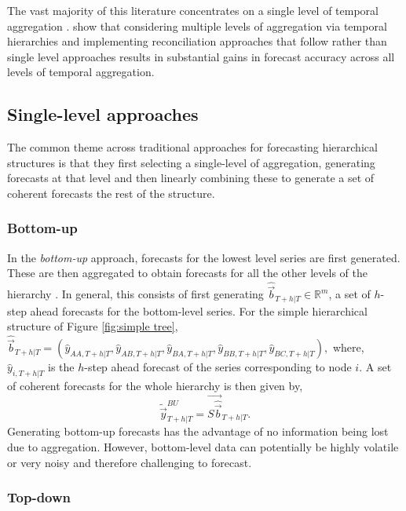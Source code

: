 \documentclass[graybox]{svmult}
\begin{document}
The vast majority of this literature concentrates on a single level of temporal aggregation \citep[there are some notable exceptions such as,][]{AndEtAl2011,KouEtAl2014}. \cite{AthEtAl2017} show that considering multiple levels of aggregation via temporal hierarchies and implementing reconciliation approaches that follow rather than single level approaches results in substantial gains in forecast accuracy across all levels of temporal aggregation.

\subsection{Single-level approaches}\label{sec:single level approaches}
The common theme across traditional approaches for forecasting hierarchical structures is that they first selecting a single-level of aggregation, generating forecasts at that level and then linearly combining these to generate a set of coherent forecasts the rest of the structure.

\subsubsection{Bottom-up}

In the \textit{bottom-up} approach, forecasts for the lowest level series are first generated. These are then aggregated to obtain forecasts for all the other levels of the hierarchy \citep{dunn1976}. In general, this consists of first generating $\hat{\vec{b}}_{T+h|T} \in \mathbb{R}^m$, a set of $h$-step ahead forecasts for the bottom-level series. For the simple hierarchical structure of Figure \ref{fig:simple tree}, $\hat{\vec{b}}_{T+h|T} = (\hat{{y}}_{AA,T+h|T}, \hat{{y}}_{AB,T+h|T}, \hat{{y}}_{BA,T+h|T}, \hat{{y}}_{BB,T+h|T},\hat{{y}}_{BC,T+h|T}),$ where, $\hat{{y}}_{i,T+h|T}$ is the $h$-step ahead forecast of the series corresponding to node $i$. A set of coherent forecasts for the whole hierarchy is then given by,
\begin{equation*}\label{eq:BU}
\tilde{\vec{y}}^{BU}_{T+h|T}=\vec{S\hat{\vec{b}}}_{T+h|T}.
\end{equation*}
Generating bottom-up forecasts has the advantage of no information being lost due to aggregation. However, bottom-level data can potentially be highly volatile or very noisy and therefore challenging to forecast.

\subsubsection{Top-down}
\end{document}
